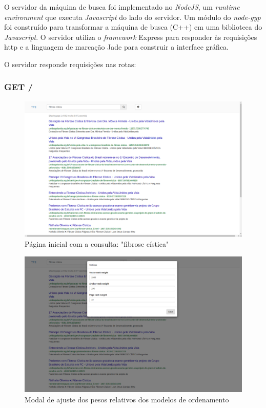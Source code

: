 \documentclass{article}
\begin{document}
O servidor da máquina de busca foi implementado no \textit{NodeJS}, um \textit{runtime environment} 
que executa \textit{Javascript} do lado do servidor. Um módulo do \textit{node-gyp} foi construído
para transformar a máquina de busca (C++) em uma biblioteca do \textit{Javascript}. O servidor
utiliza o \textit{framework} Express para responder às requisições http e a linguagem de marcação 
Jade para construir a interface gráfica. 

O servidor responde requisições nas rotas:

\subsubsection{GET /}

\begin{figure}
\centering
\includegraphics[width=\linewidth]{page_1.png}
\caption{Página inicial com a consulta: "fibrose cística"} 
\label{fig:page_1}
\end{figure}

\begin{figure}
\centering
\includegraphics[width=\linewidth]{page_1_modal.png}
\caption{Modal de ajuste dos pesos relativos dos modelos de ordenamento} 
\label{fig:page_1_modal}
\end{figure}
\end{document}
